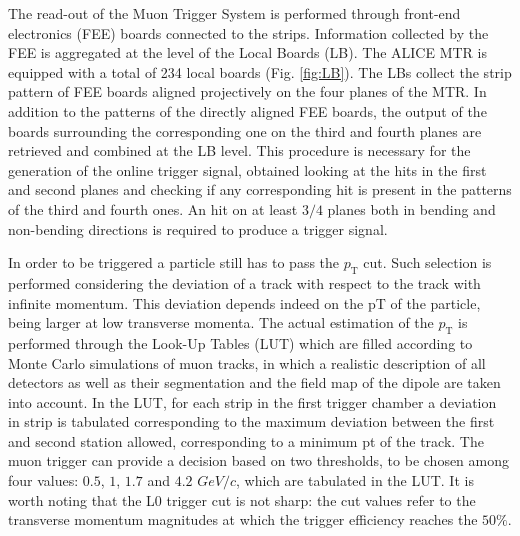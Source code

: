 The read-out of the Muon Trigger System is performed through front-end electronics (FEE) boards connected to the strips.
Information collected by the FEE is aggregated at the level of the Local Boards (LB).
The ALICE MTR is equipped with a total of 234 local boards (Fig. \ref{fig:LB}).
The LBs collect the strip pattern of FEE boards aligned projectively on the four planes of the MTR.
In addition to the patterns of the directly aligned FEE boards, the output of the boards surrounding the corresponding one on the third and fourth planes are retrieved and combined at the LB level.
This procedure is necessary for the generation of the online trigger signal, obtained looking at the hits in the first and second planes and checking if any corresponding hit is present in the patterns of the third and fourth ones.
An hit on at least $3/4$ planes both in bending and non-bending directions is required to produce a trigger signal.

In order to be triggered a particle still has to pass the $p_{\mathrm{T}}$ cut.
Such selection is performed considering the deviation of a track with respect to the track with infinite momentum.
This deviation depends indeed on the pT of the particle, being larger at low transverse momenta.
The actual estimation of the $p_{\mathrm{T}}$ is performed through the Look-Up Tables (LUT) which are filled according to Monte Carlo simulations of muon tracks, in which a realistic description of all detectors as well as their segmentation and the field map of the dipole are taken into account.
In the LUT, for each strip in the first trigger chamber a deviation in strip is tabulated corresponding to the maximum deviation between the first and second station allowed, corresponding to a minimum pt of the track.
The muon trigger can provide a decision based on two thresholds, to be chosen among four values: $0.5$, $1$, $1.7$ and $4.2$ $GeV/c$, which are tabulated in the LUT.
It is worth noting that the L0 trigger cut is not sharp: the cut values refer to the transverse momentum magnitudes at which the trigger efficiency reaches the $50\%$. 

